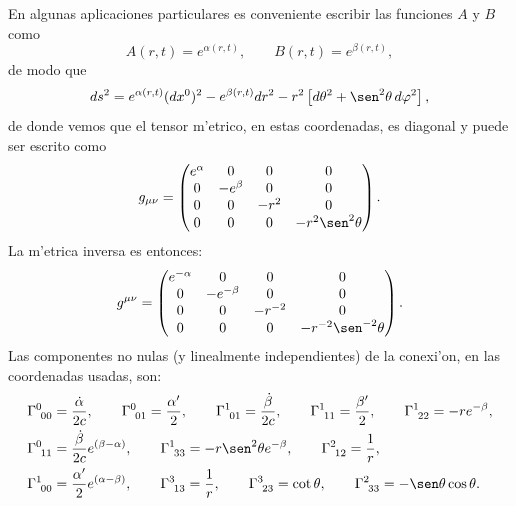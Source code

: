 En algunas aplicaciones particulares es conveniente escribir las funciones
$A$ y $B$ como
\begin{equation}\label{funcionesmetrica}
A(r,t) =e^{\alpha(r,t)}, \qquad B(r,t) =e^{\beta(r,t)},
\end{equation}
de modo que
\begin{equation}\label{ds2_rt}
ds^2=e^{\alpha(r,t)} (dx^0)^2-e^{\beta(r,t)} dr^2-r^2\left[
d\theta^2+\sen^2\theta\, d\varphi^2\right],
\end{equation}
de donde vemos que el tensor m'etrico, en estas coordenadas, es diagonal y puede
ser escrito como
\begin{equation}
g_{\mu\nu}=%
\begin{pmatrix}
e^\alpha& 0 & 0 & 0\\
0 & -e^\beta & 0 & 0\\
0 & 0 & -r^2 & 0\\
0 & 0 & 0 & -r^2\sen^2\theta
\end{pmatrix}.
\end{equation}
La m'etrica inversa es entonces:
\begin{equation}
g^{\mu\nu}=%
\begin{pmatrix}
e^{-\alpha} & 0 & 0 & 0\\
0 & -e^{-\beta} & 0 & 0\\
0 & 0 & -r^{-2} & 0\\
0 & 0 & 0 & -r^{-2}\sen^{-2}\theta
\end{pmatrix}.
\end{equation}
Las componentes no nulas (y linealmente independientes) de la conexi'on, en las
coordenadas usadas, son:
\begin{align}
\Gamma_{\ 00}^0 & =\frac{\dot{\alpha}}{2c}, \qquad
\Gamma_{\ 01}^0 =\frac{\alpha'}{2}, \qquad
\Gamma_{\ 01}^1 =\frac{\dot{\beta}}{2c}, \qquad
\Gamma_{\ 11}^1 =\frac{\beta'}{2}, \qquad
\Gamma_{\ 22}^1 =-re^{-\beta}, \label{gammas1_sch}\\
\Gamma_{\ 11}^0 & =\frac{\dot{\beta}}{2c}e^{(\beta-\alpha)}, \qquad
\Gamma_{\ 33}^1 =-r\sen^2\theta e^{-\beta}, \qquad
\Gamma_{\ 12}^2 =\frac{1}{r},\label{gammas2_sch}\\
\Gamma_{\ 00}^1 & =\frac{\alpha'}{2} e^{(\alpha-\beta)}, \qquad
\Gamma_{\ 13}^3 =\frac{1}{r}, \qquad
\Gamma_{\ 23}^3 =\cot\theta, \qquad
\Gamma_{\ 33}^2 =-\sen\theta\cos\theta .\label{gammas3_sch}
\end{align}

